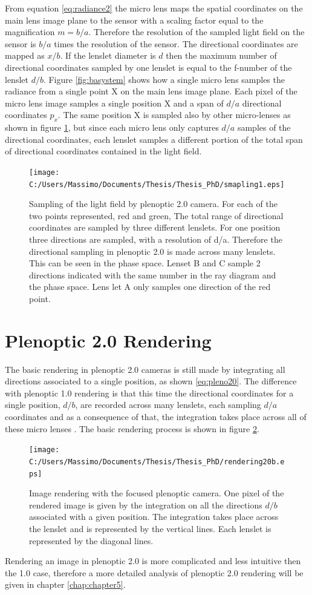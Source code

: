    From equation \ref{eq:radiance2} the micro lens maps the spatial coordinates on the main lens image plane to the sensor with a scaling factor equal to the magnification $m=b/a$. Therefore the resolution of the sampled light field on the sensor is $b/a$ times the resolution of the sensor. The directional coordinates are mapped as $x/b$. If the lenslet diameter is $d$ then the maximum number of directional coordinates sampled by one lenslet is equal to the f-number of the lenslet $d/b$. Figure \ref{fig:basystem} shows how a single micro lens samples the radiance from a single point X on the main lens image plane. Each pixel of the micro lens image samples a single position X and a span of $d/a$ directional coordinates $p_x$. The same position X is sampled also by other micro-lenses as shown in figure \ref{fig:phaseba}, but since each micro lens only captures $d/a$ samples of the directional coordinates, each lenslet samples a different portion of the total span of directional coordinates contained in the light field.
   \begin{figure}[H]
   	\centering
   	\texttt{[image: C:/Users/Massimo/Documents/Thesis/Thesis\_PhD/smapling1.eps]}
   	\caption{\label{fig:phaseba} Sampling of the light field by plenoptic 2.0 camera. For each of the two points represented, red and green, The total range of directional coordinates are sampled by three  different lenslets. For one position three directions are sampled, with a resolution of d/a. Therefore the directional sampling in plenoptic 2.0 is made across many lenslets. This can be seen in the phase space. Lenset B and C sample 2 directions indicated with the same number in the ray diagram and the phase space. Lens let A only samples one direction of the red point.   }
   \end{figure}
   \section{Plenoptic 2.0 Rendering}
   \label{sec:rendering201}
   The basic rendering in plenoptic 2.0 cameras is still made by integrating all directions associated to a single position, as shown \ref{eq:pleno20}. The difference with plenoptic 1.0 rendering is that this time the directional coordinates for a single position, $d/b$, are recorded across many lenslets, each sampling $d/a$ coordinates and as a consequence of that, the integration takes place across all of these micro lenses \cite{georgiev2006light}. The basic rendering process is shown in figure \ref{fig:render20}.
   \begin{figure}[H]
   	\centering
   	\texttt{[image: C:/Users/Massimo/Documents/Thesis/Thesis\_PhD/rendering20b.eps]}
   	\caption{\label{fig:render20} Image rendering with the focused plenoptic camera. One pixel of the rendered image is given by the integration on all the directions $d/b$ associated with a given position. The integration takes place across the lenslet and is represented by the vertical lines. Each lenslet is represented by the diagonal lines. }
   \end{figure}
   Rendering an image in plenoptic 2.0 is more complicated and less intuitive then the 1.0 case, therefore a more detailed analysis of plenoptic 2.0 rendering will be given in chapter \ref{chap:chapter5}.
